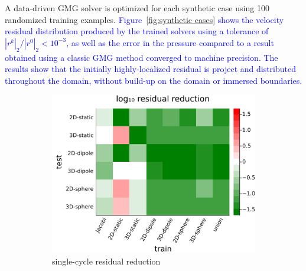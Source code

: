 \documentclass[review]{elsarticle}
\begin{document}
A data-driven GMG solver is optimized for each synthetic case using 100 randomized training examples. \textcolor{blue}{Figure~\ref{fig:synthetic cases} shows the velocity residual distribution produced by the trained solvers using a tolerance of $|r^k|_2/|r^0|_2<10^{-3}$, as well as the error in the pressure compared to a result obtained using a classic GMG method converged to machine precision. The results show that the initially highly-localized residual is project and distributed throughout the domain, without build-up on the domain or immersed boundaries.} 

\begin{figure}
    \centering
    \begin{subfigure}[b]{0.47\textwidth}
        \centering
        \includegraphics[width=\textwidth]{figures/crossloss.png}
        \caption{single-cycle residual reduction}
        \label{fig:cross plot}
    \end{subfigure}
    \hfill
    \begin{subfigure}[b]{0.47\textwidth}
        \centering

\end{subfigure}
\end{figure}
\end{document}
